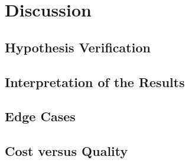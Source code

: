 \chapter{Discussion}
\label{chap:discussion}

\section{Hypothesis Verification}
\label{sec:hypothesis-verification}

\section{Interpretation of the Results}
\label{sec:interpretation}

\section{Edge Cases}
\label{sec:edge-cases}

\section{Cost versus Quality}
\label{sec:cost-vs-quality}
